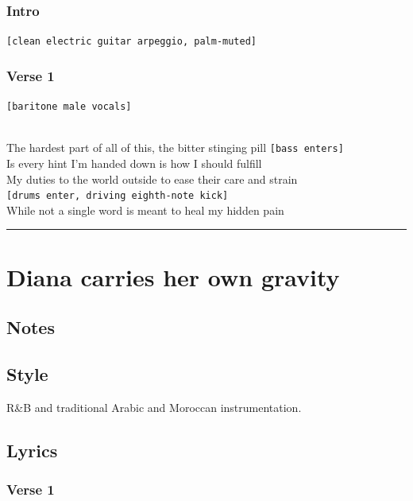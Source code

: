 \documentclass[]{article}
\begin{document}
\subsubsection{Intro}\label{intro-2}

\texttt{{[}clean\ electric\ guitar\ arpeggio,\ palm-muted{]}}

\subsubsection{Verse 1}\label{verse-1-3}

\texttt{{[}baritone\ male\ vocals{]}}\strut \\
The hardest part of all of this, the bitter stinging pill
\texttt{{[}bass\ enters{]}}\\
Is every hint I'm handed down is how I should fulfill\\
My duties to the world outside to ease their care and strain
\texttt{{[}drums\ enter,\ driving\ eighth-note\ kick{]}}\\
While not a single word is meant to heal my hidden pain

\begin{center}\rule{0.5\linewidth}{0.5pt}\end{center}

\section{Diana carries her own
gravity}\label{diana-carries-her-own-gravity}

\subsection{Notes}\label{notes-9}

\subsection{Style}\label{style-9}

R\&B and traditional Arabic and Moroccan instrumentation.

\subsection{Lyrics}\label{lyrics-9}

\subsubsection{Verse 1}\label{verse-1-4}
\end{document}
